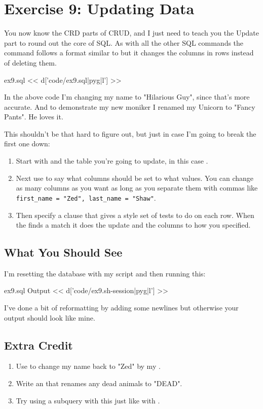 \chapter{Exercise 9: Updating Data}

You now know the CRD parts of CRUD, and I just need to teach you the Update
part to round out the core of SQL.  As with all the other SQL commands
the  command follows a format similar to  but
it changes the columns in rows instead of deleting them.

\begin{code}{ex9.sql}
<< d['code/ex9.sql|pyg|l'] >>
\end{code}

In the above code I'm changing my name to "Hilarious Guy", since that's
more accurate.  And to demonstrate my new moniker I renamed my Unicorn
to "Fancy Pants".  He loves it.

This shouldn't be that hard to figure out, but just in case I'm going to
break the first one down:

\begin{enumerate}
\item Start with  and the table you're going to update, in this
    case .
\item Next use  to say what columns should be set to what values.
    You can change as many columns as you want as long as you separate them
    with commas like \verb|first_name = "Zed", last_name = "Shaw"|.
\item Then specify a  clause that gives a  style
    set of tests to do on each row.  When the  finds a match it
    does the update and  the columns to how you specified.
\end{enumerate}

\section{What You Should See}

I'm resetting the database with my  script and then running
this:

\begin{code}{ex9.sql Output}
<< d['code/ex9.sh-session|pyg|l'] >>
\end{code}

I've done a bit of reformatting by adding some newlines but otherwise
your output should look like mine.

\section{Extra Credit}

\begin{enumerate}
\item Use  to change my name back to "Zed" by my .
\item Write an  that renames any dead animals to "DEAD".
\item Try using a subquery with this just like with .
\end{enumerate}


